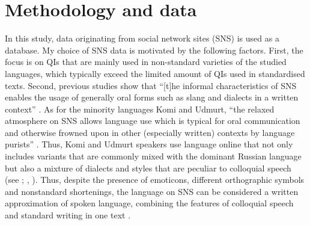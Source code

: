 \documentclass[output=paper,colorlinks,citecolor=brown]{langscibook}
\begin{document}
\section{Methodology and data}\label{sec:teptiuk:3}

In this study, data originating from social network sites (SNS) is used as a database. My choice of SNS data is motivated by the following factors. First, the focus is on QIs that are mainly used in non-standard varieties of the studied languages, which typically exceed the limited amount of QIs used in standardised texts. Second, previous studies show that “[t]he informal characteristics of SNS enables the usage of generally oral forms such as slang and dialects in a written context” \citep[144]{Pischlöger2014}. As for the minority languages Komi and Udmurt, “the relaxed atmosphere on SNS allows language use which is typical for oral communication and otherwise frowned upon in other (especially written) contexts by language purists” \citep[144]{Pischlöger2014}. Thus, Komi and Udmurt speakers use language online that not only includes variants that are commonly mixed with the dominant Russian language but also a mixture of dialects and styles that are peculiar to colloquial speech (see \citealt{Pischlöger2016}; \citealt{Edygarova2013}, \citeyear{Edygarova2014}). Thus, despite the presence of emoticons, different orthographic symbols and nonstandard shortenings, the language on SNS can be considered a written approximation of spoken language, combining the features of colloquial speech and standard writing in one text \citep{HelasvuoEtAl2014}.
\end{document}
